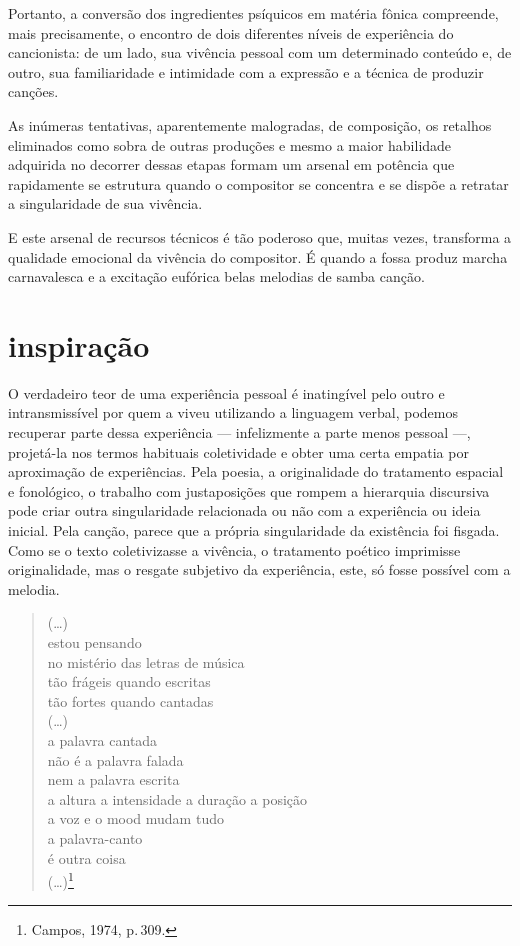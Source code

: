 Portanto, a conversão dos ingredientes psíquicos em matéria fônica
compreende, mais precisamente, o encontro de dois diferentes níveis de
experiência do cancionista: de um lado, sua vivência pessoal com um
determinado conteúdo e, de outro, sua familiaridade e intimidade com a
expressão e a técnica de produzir canções.

As inúmeras tentativas, aparentemente malogradas, de composição, os
retalhos eliminados como sobra de outras produções e mesmo a maior
habilidade adquirida no decorrer dessas etapas formam um arsenal em
potência que rapidamente se estrutura quando o compositor se concentra e
se dispõe a retratar a singularidade de sua vivência.

E este arsenal de recursos técnicos é tão poderoso que, muitas vezes,
transforma a qualidade emocional da vivência do compositor. É quando a
fossa produz marcha carnavalesca e a excitação eufórica belas melodias
de samba canção.

\section{inspiração}

O verdadeiro teor de uma experiência pessoal é inatingível pelo outro e
intransmissível por quem a viveu utilizando a linguagem verbal, podemos
recuperar parte dessa experiência --- infelizmente a parte menos pessoal ---,
projetá-la nos termos habituais coletividade e obter uma certa empatia
por aproximação de experiências. Pela poesia, a originalidade do
tratamento espacial e fonológico, o trabalho com justaposições que
rompem a hierarquia discursiva pode criar outra singularidade
relacionada ou não com a experiência ou ideia inicial. Pela canção,
parece que a própria singularidade da existência foi fisgada. Como se o
texto coletivizasse a vivência, o tratamento poético imprimisse
originalidade, mas o resgate subjetivo da experiência, este, só fosse
possível com a melodia.

\begin{verse}
\small{(\ldots)\\
estou pensando\\
no mistério das letras de música\\
tão frágeis quando escritas\\
tão fortes quando cantadas\\
(\ldots)\\
a palavra cantada\\
não é a palavra falada\\
nem a palavra escrita\\
a altura a intensidade a duração a posição\\
a voz e o mood mudam tudo\\
a palavra-canto\\
é outra coisa\\
(\ldots)}\footnote{Campos, 1974, p.\,309.}\\
\end{verse}

